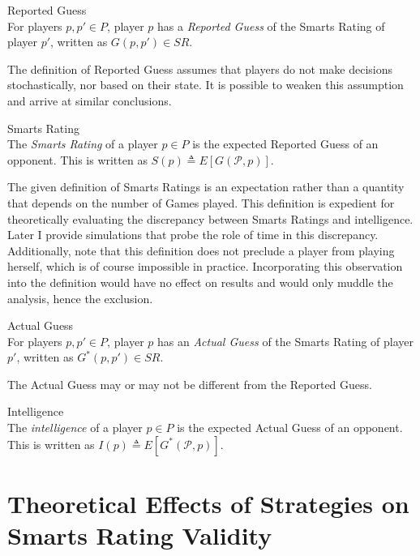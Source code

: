 \theoremstyle{definition}
\begin{definition}{Reported Guess}\\
For players $p, p' \in P$, player $p$ has a \textit{Reported Guess} of the Smarts Rating of player $p'$, written as $G(p, p') \in SR$.
\end{definition}

\noindent The definition of Reported Guess assumes that players do not make decisions stochastically, nor based on their state. It is possible to weaken this assumption and arrive at similar conclusions.

\theoremstyle{definition}
\begin{definition}{Smarts Rating}\\
The \textit{Smarts Rating} of a player $p \in P$ is the expected Reported Guess of an opponent. This is written as $S(p) \triangleq E[G(\mathcal{P}, p)]$.
\end{definition}

\noindent The given definition of Smarts Ratings is an expectation rather than a quantity that depends on the number of Games played. This definition is expedient for theoretically evaluating the discrepancy between Smarts Ratings and intelligence. Later I provide simulations that probe the role of time in this discrepancy. Additionally, note that this definition does not preclude a player from playing herself, which is of course impossible in practice. Incorporating this observation into the definition would have no effect on results and would only muddle the analysis, hence the exclusion.

\theoremstyle{definition}
\begin{definition}{Actual Guess}\\
For players $p, p' \in P$, player $p$ has an \textit{Actual Guess} of the Smarts Rating of player $p'$, written as $G^*(p, p') \in SR$.
\end{definition}

\noindent The Actual Guess may or may not be different from the Reported Guess.

\theoremstyle{definition}
\begin{definition}{Intelligence}\\
The \textit{intelligence} of a player $p \in P$ is the expected Actual Guess of an opponent. This is written as $I(p) \triangleq E[G^*(\mathcal{P}, p)]$.
\end{definition}

\section{Theoretical Effects of Strategies on Smarts Rating Validity}

